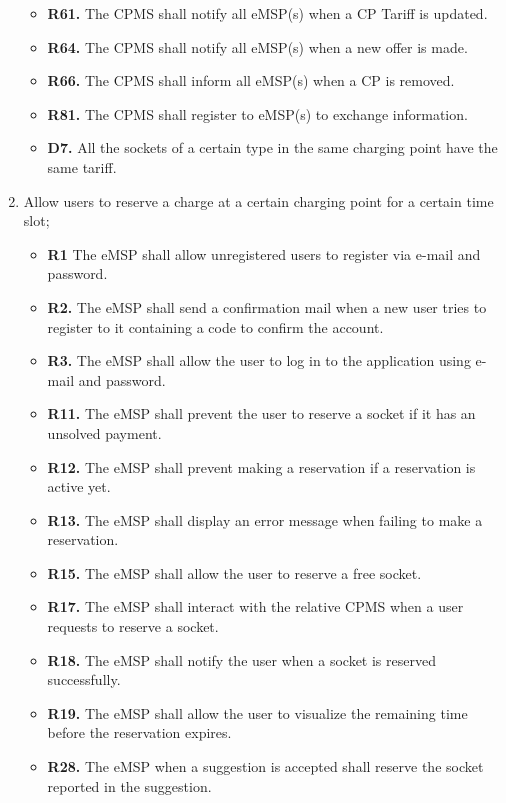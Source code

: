 \documentclass{Configuration_Files/PoliMi3i_thesis}
\begin{document}
\begin{enumerate}[label=\textbf{G\arabic*}]
\begin{itemize}
            \item \textbf{R61.} The CPMS  shall notify all eMSP(s) when a CP Tariff is updated.
            \item \textbf{R64.} The CPMS  shall notify all eMSP(s) when a new offer is made.
            \item \textbf{R66.} The CPMS shall inform all eMSP(s) when a CP is removed.
            \item \textbf{R81.} The CPMS shall register to eMSP(s) to exchange information.
            \item \textbf{D7.} All the sockets of a certain type in the same charging point have the same tariff.
        \end{itemize}
    
    \item Allow users to reserve a charge at a certain charging point for a certain time slot;
        \begin{itemize}
            \item \textbf{R1} The eMSP shall allow unregistered users to register via e-mail and password.
            \item \textbf{R2.} The eMSP shall send a confirmation mail when a new user tries to register to it containing a code to confirm the account.
            \item \textbf{R3.} The eMSP shall allow the user to log in to the application using e-mail and password.
            \item \textbf{R11.} The eMSP shall prevent the user to reserve a socket if it has an unsolved payment.
            \item \textbf{R12.} The eMSP shall prevent making a reservation if a reservation is active yet.
            \item \textbf{R13.} The eMSP shall display an error message when failing to make a reservation.
            \item \textbf{R15.} The eMSP shall allow the user to reserve a free socket.
            \item \textbf{R17.} The eMSP shall interact with the relative CPMS when a user requests to reserve a socket.
            \item \textbf{R18.} The eMSP shall notify the user when a socket is reserved successfully.
            \item \textbf{R19.} The eMSP shall allow the user to visualize the remaining time before the reservation expires.
            \item \textbf{R28.} The eMSP when a suggestion is accepted shall reserve the socket reported in the suggestion.

\end{itemize}
\end{enumerate}
\end{document}
